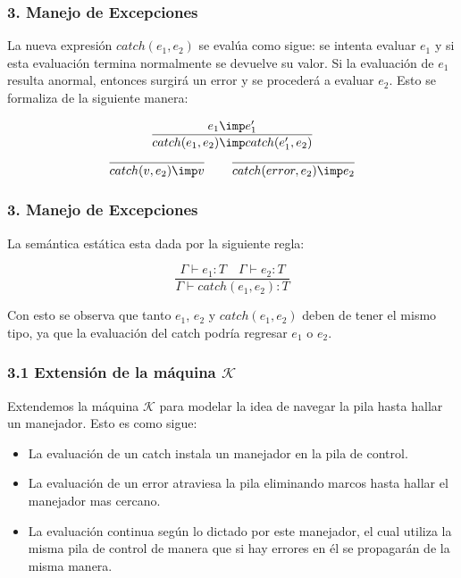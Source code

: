 \documentclass[xcolor=dvipsnames,table,spanish]{beamer}
\begin{document}
\begin{frame}
\frametitle{3. Manejo de Excepciones}
La nueva expresión $catch(e_1,e_2)$ se evalúa como sigue: se intenta evaluar $e_1$ y si esta evaluación termina normalmente se devuelve su valor. Si la evaluación de $e_1$ resulta anormal, entonces surgirá un error y se procederá a evaluar $e_2$. Esto se formaliza de la siguiente manera:

 \begin{center}
      \begin{equation*}
         \frac{e_1 \imp e_1'}{catch(e_1,e_2) \imp catch(e_1',e_2)}
	  \end{equation*}
      \begin{equation*}
         \frac{}{catch(v,e_2) \imp v}
         \qquad
           \frac{}{catch(error,e_2) \imp e_2}
	  \end{equation*}

  \end{center}
\end{frame}

\begin{frame}
\frametitle{3. Manejo de Excepciones}
La semántica estática esta dada por la siguiente regla:
\begin{center}
      \begin{equation*}
         \frac{\Gamma \vdash e_1:T \quad \Gamma \vdash e_2:T}{\Gamma \vdash catch(e_1,e_2):T}
	  \end{equation*}
  \end{center}
  Con esto se observa que tanto $e_1$, $e_2$ y $catch(e_1,e_2)$ deben de tener el mismo tipo, ya que la evaluación del catch podría regresar $e_1$ o $e_2$.
\end{frame}

\begin{frame}
\frametitle{3.1 Extensión de la máquina $\mathcal{K}$}
Extendemos la máquina $\mathcal{K}$ para modelar la idea de navegar la pila hasta hallar un manejador. Esto es como sigue:
\begin{itemize}
		\item La evaluación de un catch instala un manejador en la pila de control.
		\item La evaluación de un error atraviesa la pila eliminando marcos hasta hallar el manejador mas cercano.
		\item La evaluación continua según lo dictado por este manejador, el cual utiliza la misma pila de control de manera que si hay errores en él se propagarán de la misma manera.
\end{itemize}

\end{frame}
\end{document}
